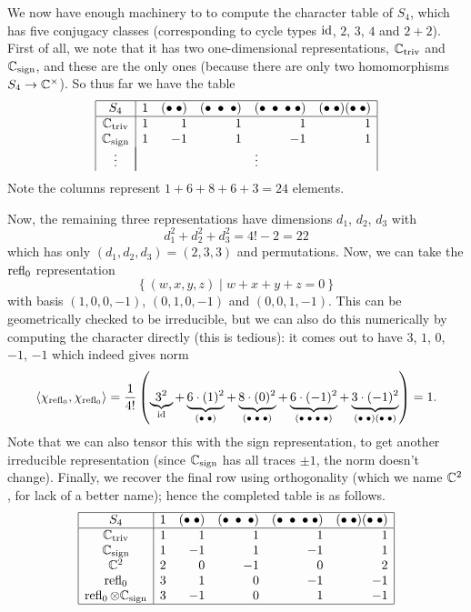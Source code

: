 \begin{example}
	We now have enough machinery to to compute the character
	table of $S_4$, which has five conjugacy classes
	(corresponding to cycle types $\mathrm{id}$, $2$, $3$, $4$ and $2+2$).
	First of all, we note that it has two one-dimensional representations,
	$\mathbb C_{\mathrm{triv}}$ and $\mathbb C_{\mathrm{sign}}$, and these are the only ones
	(because there are only two homomorphisms $S_4 \to \mathbb C^\times$).
	So thus far we have the table
	\[
		\begin{array}{|c|rrrrr|}
			\hline
			S_4 & 1 & (\bullet\;\bullet) & (\bullet\;\bullet\;\bullet)
				& (\bullet\;\bullet\;\bullet\;\bullet)
				& (\bullet\;\bullet)(\bullet\;\bullet)
				\\ \hline
			\Ctriv & 1 & 1 & 1 & 1 & 1 \\
			\Csign & 1 & -1 & 1 & -1 & 1 \\
			\vdots & \multicolumn{5}{|c|}{\vdots}
		\end{array}
	\]
	Note the columns represent $1+6+8+6+3=24$ elements.

	Now, the remaining three representations have dimensions
	$d_1$, $d_2$, $d_3$ with
	\[ d_1^2 + d_2^2 + d_3^2 = 4! - 2 = 22 \]
	which has only $(d_1, d_2, d_3) = (2,3,3)$ and permutations.
	Now, we can take the $\operatorname{refl}_0$ representation
	\[ \left\{ (w,x,y,z) \mid w+x+y+z=0 \right\} \]
	with basis $(1,0,0,-1)$, $(0,1,0,-1)$ and $(0,0,1,-1)$.
	This can be geometrically checked to be irreducible,
	but we can also do this numerically by computing the
	character directly (this is tedious):
	it comes out to have $3$, $1$, $0$, $-1$, $-1$
	which indeed gives norm
	\[
		\left< \chi_{\operatorname{refl}_0}, \chi_{\operatorname{refl}_0} \right>
		=
		\frac{1}{4!}
		\left(
			\underbrace{3^2}_{\mathrm{id}}
			+ \underbrace{6\cdot(1)^2}_{(\bullet\;\bullet)}
			+ \underbrace{8\cdot(0)^2}_{(\bullet\;\bullet\;\bullet)}
			+ \underbrace{6\cdot(-1)^2}_{(\bullet\;\bullet\;\bullet\;\bullet)}
			+ \underbrace{3\cdot(-1)^2}_{(\bullet\;\bullet)(\bullet\;\bullet)}
		\right)
		= 1.
	\]
	Note that we can also tensor this with the sign representation,
	to get another irreducible representation
	(since $\mathbb C_{\mathrm{sign}}$ has all traces $\pm 1$, the norm doesn't change).
	Finally, we recover the final row using orthogonality
	(which we name $\mathbb C^2$, for lack of a better name);
	hence the completed table is as follows.
	\[
		\begin{array}{|c|rrrrr|}
			\hline
			S_4 & 1 & (\bullet\;\bullet) & (\bullet\;\bullet\;\bullet)
				& (\bullet\;\bullet\;\bullet\;\bullet)
				& (\bullet\;\bullet)(\bullet\;\bullet)
				\\ \hline
			\mathbb C_{\mathrm{triv}} & 1 & 1 & 1 & 1 & 1 \\
			\mathbb C_{\mathrm{sign}} & 1 & -1 & 1 & -1 & 1 \\
			\mathbb C^2 & 2 & 0 & -1 & 0 & 2 \\
			\operatorname{refl}_0 & 3 & 1 & 0 & -1 & -1 \\
			\operatorname{refl}_0 \otimes \mathbb C_{\mathrm{sign}} & 3 & -1 & 0 & 1 & -1 \\\hline
		\end{array}
	\]
\end{example}

